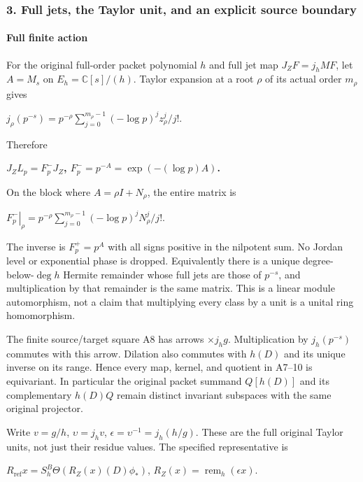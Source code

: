 \subsubsection{3. Full jets, the Taylor unit, and an explicit source boundary}\label{endpoint-f1_scaling--full-jets-the-taylor-unit-and-an-explicit-source-boundary}

\paragraph{Full finite action}\label{endpoint-f1_scaling--full-finite-action}

For the original full-order packet polynomial \(h\) and full jet map \(J_ZF=j_h MF\), let \(A=M_s\) on \(E_h=\mathbb C[s]/(h)\). Taylor expansion at a root \(\rho\) of its actual order \(m_\rho\) gives

\(j_\rho(p^{-s})=p^{-\rho} \sum_{j=0}^{m_\rho-1}(-\log p)^j z_\rho^j/j!\).

Therefore

\textbf{\(J_Z L_p=F_p^- J_Z\), \(F_p^-=p^{-A}=\exp(-(\log p)A)\).}

On the block where \(A=\rho I+N_\rho\), the entire matrix is

\(\left.F_p^-\right|_\rho=p^{-\rho}\sum_{j=0}^{m_\rho-1}(-\log p)^j N_\rho^j/j!\).

The inverse is \(F_p^+=p^A\) with all signs positive in the nilpotent sum. No Jordan level or exponential phase is dropped. Equivalently there is a unique degree-below-\(\deg h\) Hermite remainder whose full jets are those of \(p^{-s}\), and multiplication by that remainder is the same matrix. This is a linear module automorphism, not a claim that multiplying every class by a unit is a unital ring homomorphism.

The finite source/target square A8 has arrows \(\times j_hg\). Multiplication by \(j_h(p^{-s})\) commutes with this arrow. Dilation also commutes with \(h(D)\) and its unique inverse on its range. Hence every map, kernel, and quotient in A7--10 is equivariant. In particular the original packet summand \(Q[h(D)]\) and its complementary \(h(D)Q\) remain distinct invariant subspaces with the same original projector.

Write \(v=g/h\), \(\upsilon=j_hv\), \(\epsilon=\upsilon^{-1}=j_h(h/g)\). These are the full original Taylor units, not just their residue values. The specified representative is

\(R_{\mathrm{ref}} x=S_h^B \Theta(R_Z(x)(D)\phi_*)\), \(R_Z(x)=\operatorname{rem}_h(\epsilon x)\).

